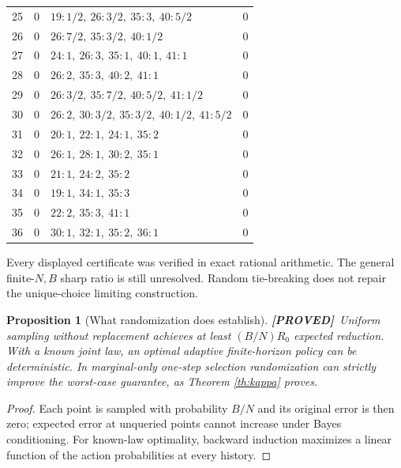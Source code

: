 \documentclass[11pt]{article}
\newtheorem{proposition}[theorem]{Proposition}
\theoremstyle{definition}
\newcommand{\1}{\mathbf 1}
\newcommand{\pr}{\textbf{[PROVED]}}
\begin{document}
\begin{longtable}{r r p{} r}
25 & $0$ & $19:1/2,\ 26:3/2,\ 35:3,\ 40:5/2$ & $0$\\
26 & $0$ & $26:7/2,\ 35:3/2,\ 40:1/2$ & $0$\\
27 & $0$ & $24:1,\ 26:3,\ 35:1,\ 40:1,\ 41:1$ & $0$\\
28 & $0$ & $26:2,\ 35:3,\ 40:2,\ 41:1$ & $0$\\
29 & $0$ & $26:3/2,\ 35:7/2,\ 40:5/2,\ 41:1/2$ & $0$\\
30 & $0$ & $26:2,\ 30:3/2,\ 35:3/2,\ 40:1/2,\ 41:5/2$ & $0$\\
31 & $0$ & $20:1,\ 22:1,\ 24:1,\ 35:2$ & $0$\\
32 & $0$ & $26:1,\ 28:1,\ 30:2,\ 35:1$ & $0$\\
33 & $0$ & $21:1,\ 24:2,\ 35:2$ & $0$\\
34 & $0$ & $19:1,\ 34:1,\ 35:3$ & $0$\\
35 & $0$ & $22:2,\ 35:3,\ 41:1$ & $0$\\
36 & $0$ & $30:1,\ 32:1,\ 35:2,\ 36:1$ & $0$\\
\bottomrule
\end{longtable}
\normalsize
Every displayed certificate was verified in exact rational arithmetic.
The general finite-$N,B$ sharp ratio is still unresolved.
Random tie-breaking does not repair the unique-choice limiting construction.

\begin{proposition}[What randomization does establish]
\pr\ Uniform sampling without replacement achieves at least
$(B/N)R_0$ expected reduction. With a known joint law, an optimal adaptive
finite-horizon policy can be deterministic. In marginal-only one-step
selection randomization can strictly improve the worst-case guarantee,
as Theorem \ref{th:kappa} proves.
\end{proposition}
\begin{proof}
Each point is sampled with probability $B/N$ and its original error is then
zero; expected error at unqueried points cannot increase under Bayes
conditioning. For known-law optimality, backward induction maximizes a
linear function of the action probabilities at every history.
\end{proof}
\end{document}
